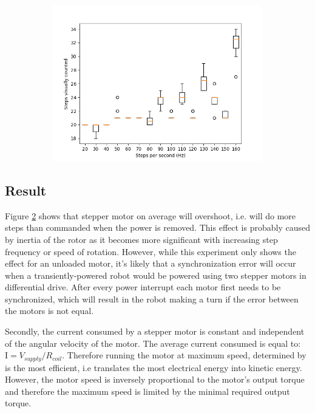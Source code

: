 \begin{figure}
\begin{subfigure}[b]{0.55\textwidth}
		\includegraphics[width=\textwidth]{pics/figure_intertia.png}
		\caption{}
		\label{fig:step_results}
	\end{subfigure}
	\caption{}
\end{figure}

\subsection{Result}

Figure \ref{fig:step_results} shows that stepper motor on average will overshoot, i.e. will do more steps than commanded when the power is removed.
This effect is probably caused by inertia of the rotor as it becomes more significant with increasing step frequency or speed of rotation.
However, while this experiment only shows the effect for an unloaded motor, it's likely that a synchronization error will occur when a transiently-powered robot would be powered using two stepper motors in differential drive.
After every power interrupt each motor first needs to be synchronized, which will result in the robot making a turn if the error between the motors is not equal.

Secondly, the current consumed by a stepper motor is constant and independent of the angular velocity of the motor.
The average current consumed is equal to: $\textrm{I} = V_{supply}/R_{coil}$.
Therefore running the motor at maximum speed, determined by  is the most efficient, i.e translates the most electrical energy into kinetic energy.
However, the motor speed is inversely proportional to the motor's output torque and therefore the maximum speed is limited by the minimal required output torque.





